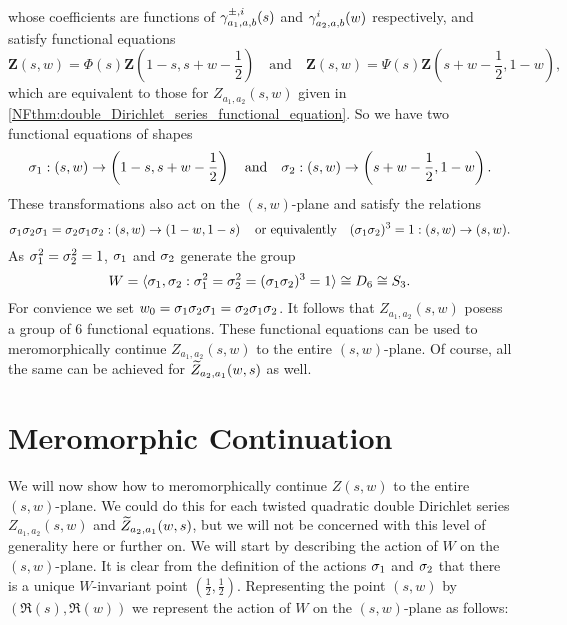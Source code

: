     whose coefficients are functions of $\gamma_{a_{1},a,b}^{\pm,i}(s)$ and $\gamma_{a_{2},a,b}^{i}(w)$ respectively, and satisfy functional equations
    \[
        \mathbf{Z}(s,w) = \Phi(s)\mathbf{Z}\left(1-s,s+w-\frac{1}{2}\right) \quad \text{and} \quad \mathbf{Z}(s,w) = \Psi(s)\mathbf{Z}\left(s+w-\frac{1}{2},1-w\right),
    \]
    which are equivalent to those for $Z_{a_{1},a_{2}}(s,w)$ given in \cref{NFthm:double_Dirichlet_series_functional_equation}. So we have two functional equations of shapes
    \[
        \sigma_{1}:(s,w) \to \left(1-s,s+w-\frac{1}{2}\right) \quad \text{and} \quad \sigma_{2}:(s,w) \to \left(s+w-\frac{1}{2},1-w\right).
    \]
    These transformations also act on the $(s,w)$-plane and satisfy the relations
    \[
        \sigma_{1}\sigma_{2}\sigma_{1} = \sigma_{2}\sigma_{1}\sigma_{2}:(s,w) \to \left(1-w,1-s\right) \quad \text{or equivalently} \quad (\sigma_{1}\sigma_{2})^{3} = 1:(s,w) \to (s,w).
    \]
    As $\sigma_{1}^{2} = \sigma_{2}^{2} = 1$, $\sigma_{1}$ and $\sigma_{2}$ generate the group
    \[
        W = \langle\sigma_{1},\sigma_{2}:\sigma_{1}^{2} = \sigma_{2}^{2} = (\sigma_{1}\sigma_{2})^{3} = 1\rangle \cong D_{6} \cong S_{3}.
    \]
    For convience we set $w_{0} = \sigma_{1}\sigma_{2}\sigma_{1} = \sigma_{2}\sigma_{1}\sigma_{2}$. It follows that $Z_{a_{1},a_{2}}(s,w)$ posess a group of $6$ functional equations. These functional equations can be used to meromorphically continue $Z_{a_{1},a_{2}}(s,w)$ to the entire $(s,w)$-plane. Of course, all the same can be achieved for $\widetilde{Z}_{a_{2},a_{1}}(w,s)$ as well.
\section{Meromorphic Continuation}
    We will now show how to meromorphically continue $Z(s,w)$ to the entire $(s,w)$-plane. We could do this for each twisted quadratic double Dirichlet series $Z_{a_{1},a_{2}}(s,w)$ and $\widetilde{Z}_{a_{2},a_{1}}(w,s)$, but we will not be concerned with this level of generality here or further on. We will start by describing the action of $W$ on the $(s,w)$-plane. It is clear from the definition of the actions $\sigma_{1}$ and $\sigma_{2}$ that there is a unique $W$-invariant point $\left(\frac{1}{2},\frac{1}{2}\right)$. Representing the point $(s,w)$ by $(\Re(s),\Re(w))$ we represent the action of $W$ on the $(s,w)$-plane as follows:

